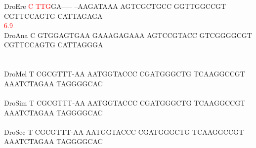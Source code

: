 \documentclass[11pt,twoside,reqno,a4paper]{article}
\begin{document}
{DroEre	\textcolor{Red}{C}	\textcolor{Red}{T}\textcolor{Red}{T}\textcolor{Red}{G}GA-----	--AAGATAAA	AGTCGCTGCC	GGTTGGCCGT	CGTTCCAGTG	CATTAGAGA\\
\hspace*{7\charwidth}\hspace*{0\charwidth}\textcolor{Red}{6.9}\hspace*{1\charwidth}\hspace*{1\charwidth}\hspace*{1\charwidth}\hspace*{1\charwidth}\hspace*{1\charwidth}\hspace*{1\charwidth}\\
DroAna	C	GTGGAGTGAA	GAAAGAGAAA	AGTCCGTACC	GTCGGGGCGT	CGTTCCAGTG	CATTAGGGA\\
\hspace*{7\charwidth}\hspace*{1\charwidth}\hspace*{1\charwidth}\hspace*{1\charwidth}\hspace*{1\charwidth}\hspace*{1\charwidth}\hspace*{1\charwidth}\\
\\
DroMel	T	CGCGTTT-AA	AATGGTACCC	CGATGGGCTG	TCAAGGCCGT	AAATCTAGAA	TAGGGGCAC\\
\hspace*{7\charwidth}\hspace*{1\charwidth}\hspace*{1\charwidth}\hspace*{1\charwidth}\hspace*{1\charwidth}\hspace*{1\charwidth}\hspace*{1\charwidth}\\
DroSim	T	CGCGTTT-AA	AATGGTACCC	CGATGGGCTG	TCAAGGCCGT	AAATCTAGAA	TAGGGGCAC\\
\hspace*{7\charwidth}\hspace*{1\charwidth}\hspace*{1\charwidth}\hspace*{1\charwidth}\hspace*{1\charwidth}\hspace*{1\charwidth}\hspace*{1\charwidth}\\
DroSec	T	CGCGTTT-AA	AATGGTACCC	CGATGGGCTG	TCAAGGCCGT	AAATCTAGAA	TAGGGGCAC\\
}
\end{document}

